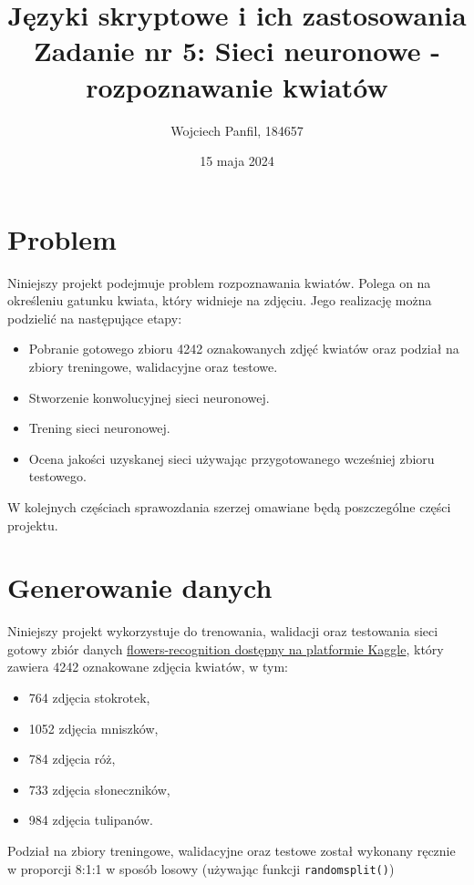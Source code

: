 \documentclass[11pt]{article}
\title{
	\textbf{Języki skryptowe i ich zastosowania}\\
	Zadanie nr 5: Sieci neuronowe - rozpoznawanie kwiatów}
\author{Wojciech Panfil, 184657}
\date{15 maja 2024}
\begin{document}
	\maketitle

	\section{Problem}
	Niniejszy projekt podejmuje problem rozpoznawania kwiatów. Polega on na określeniu
	gatunku kwiata, który widnieje na zdjęciu. Jego realizację można podzielić na następujące etapy:
	\begin{itemize}
		\item Pobranie gotowego zbioru 4242 oznakowanych zdjęć kwiatów oraz podział na zbiory treningowe, walidacyjne oraz testowe.
		\item Stworzenie konwolucyjnej sieci neuronowej.
		\item Trening sieci neuronowej.
		\item Ocena jakości uzyskanej sieci używając przygotowanego wcześniej zbioru testowego.
	\end{itemize}

	W kolejnych częściach sprawozdania szerzej omawiane będą poszczególne części projektu.

	\section{Generowanie danych}
	Niniejszy projekt wykorzystuje do trenowania, walidacji oraz testowania sieci gotowy
	zbiór danych \href{https://www.kaggle.com/datasets/alxmamaev/flowers-recognition}{flowers-recognition dostępny na platformie Kaggle},
	który zawiera 4242 oznakowane zdjęcia kwiatów, w tym:
	\begin{itemize}
		\item 764 zdjęcia stokrotek,
		\item 1052 zdjęcia mniszków,
		\item 784 zdjęcia róż,
		\item 733 zdjęcia słoneczników,
		\item 984 zdjęcia tulipanów.
	\end{itemize}
	Podział na zbiory treningowe, walidacyjne oraz testowe został wykonany ręcznie w proporcji 8:1:1 w sposób losowy
	(używając funkcji \texttt{randomsplit()})
\end{document}
